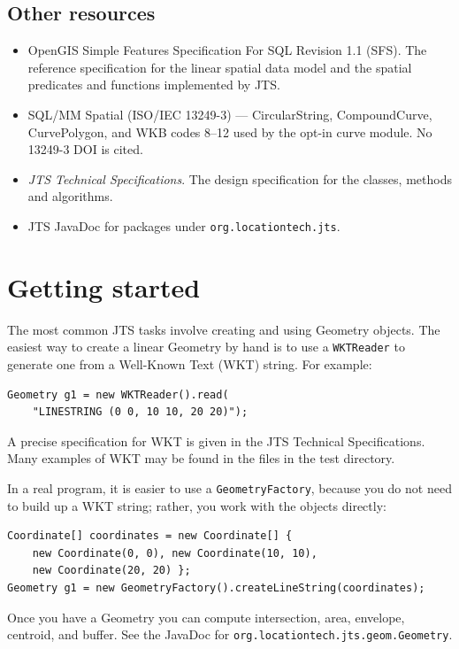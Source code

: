 \documentclass[11pt]{article}
\begin{document}
\subsection{Other resources}
\begin{itemize}
  \item OpenGIS Simple Features Specification For SQL Revision 1.1
        (SFS). The reference specification for the linear spatial data
        model and the spatial predicates and functions implemented by
        JTS.
  \item SQL/MM Spatial (ISO/IEC 13249-3) --- CircularString,
        CompoundCurve, CurvePolygon, and WKB codes 8--12 used by the
        opt-in curve module. No 13249-3 DOI is cited.
  \item \emph{JTS Technical Specifications}. The design specification
        for the classes, methods and algorithms.
  \item JTS JavaDoc for packages under \texttt{org.locationtech.jts}.
\end{itemize}

\section{Getting started}
The most common JTS tasks involve creating and using Geometry objects.
The easiest way to create a linear Geometry by hand is to use a
\texttt{WKTReader} to generate one from a Well-Known Text (WKT)
string. For example:

\begin{lstlisting}
Geometry g1 = new WKTReader().read(
    "LINESTRING (0 0, 10 10, 20 20)");
\end{lstlisting}

A precise specification for WKT is given in the JTS Technical
Specifications. Many examples of WKT may be found in the files in the
test directory.

In a real program, it is easier to use a \texttt{GeometryFactory},
because you do not need to build up a WKT string; rather, you work
with the objects directly:

\begin{lstlisting}
Coordinate[] coordinates = new Coordinate[] {
    new Coordinate(0, 0), new Coordinate(10, 10),
    new Coordinate(20, 20) };
Geometry g1 = new GeometryFactory().createLineString(coordinates);
\end{lstlisting}

Once you have a Geometry you can compute intersection, area, envelope,
centroid, and buffer. See the JavaDoc for
\texttt{org.locationtech.jts.geom.Geometry}.
\end{document}
